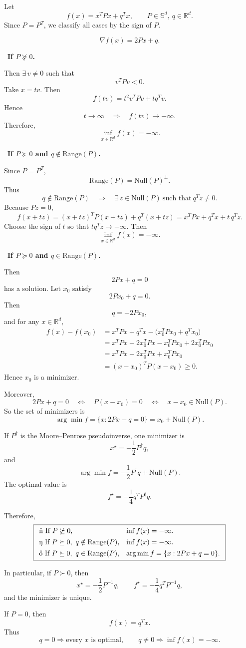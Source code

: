 \documentclass[11pt,letter,notitlepage]{article}
\theoremstyle{definition}
\begin{document}
\begin{solution}
Let
\[
f(x)=x^TPx+q^Tx,\qquad P\in\mathbb S^d,\ q\in\mathbb R^d.
\]
Since \(P=P^T\), we classify all cases by the sign of \(P\).

\[
\nabla f(x)=2Px+q.
\]

\ \textbf{If \(P\not\succeq 0\).}

Then \(\exists\,v\neq 0\) such that
\[
v^TPv<0.
\]
Take \(x=t v\). Then
\[
f(tv)=t^2v^TPv+tq^Tv.
\]
Hence
\[
t\to\infty
\quad\Longrightarrow\quad
f(tv)\to -\infty.
\]
Therefore,
\[
\inf_{x\in\mathbb R^d} f(x)=-\infty.
\]

\ \textbf{If \(P\succeq 0\) and \(q\notin\mathrm{Range}(P)\).}

Since \(P=P^T\),
\[
\mathrm{Range}(P)=\mathrm{Null}(P)^\perp.
\]
Thus
\[
q\notin\mathrm{Range}(P)
\quad\Longrightarrow\quad
\exists\,z\in\mathrm{Null}(P)\ \text{such that}\ q^Tz\neq 0.
\]
Because \(Pz=0\),
\[
f(x+t z)
=(x+t z)^TP(x+t z)+q^T(x+t z)
= x^TPx+q^Tx+t\,q^Tz.
\]
Choose the sign of \(t\) so that \(tq^Tz\to -\infty\). Then
\[
\inf_{x\in\mathbb R^d} f(x)=-\infty.
\]

\ \textbf{If \(P\succeq 0\) and \(q\in\mathrm{Range}(P)\).}

Then
\[
2Px+q=0
\]
has a solution. Let \(x_0\) satisfy
\[
2Px_0+q=0.
\]
Then
\[
q=-2Px_0,
\]
and for any \(x\in\mathbb R^d\),
\[
\begin{aligned}
f(x)-f(x_0)
&=x^TPx+q^Tx-\bigl(x_0^TPx_0+q^Tx_0\bigr)\\
&=x^TPx-2x_0^TPx-x_0^TPx_0+2x_0^TPx_0\\
&=x^TPx-2x_0^TPx+x_0^TPx_0\\
&=(x-x_0)^TP(x-x_0)\ge 0.
\end{aligned}
\]
Hence \(x_0\) is a minimizer.

Moreover,
\[
2Px+q=0
\quad\Longleftrightarrow\quad
P(x-x_0)=0
\quad\Longleftrightarrow\quad
x-x_0\in\mathrm{Null}(P).
\]
So the set of minimizers is
\[
\arg\min f
=
\{x:2Px+q=0\}
=
x_0+\mathrm{Null}(P).
\]

If \(P^\dagger\) is the Moore--Penrose pseudoinverse, one minimizer is
\[
x^\star=-\frac12 P^\dagger q,
\]
and
\[
\arg\min f
=
-\frac12 P^\dagger q+\mathrm{Null}(P).
\]
The optimal value is
\[
f^\star=-\frac14 q^TP^\dagger q.
\]

Therefore,
\[
\boxed{
\begin{array}{ll}
\ding{172}\ \text{If }P\not\succeq 0, & \inf f(x)=-\infty.\\[0.4em]
\ding{173}\ \text{If }P\succeq 0,\ q\notin\mathrm{Range}(P), & \inf f(x)=-\infty.\\[0.4em]
\ding{174}\ \text{If }P\succeq 0,\ q\in\mathrm{Range}(P), &
\arg\min f=\{x:2Px+q=0\}.
\end{array}}
\]

In particular, if \(P\succ 0\), then
\[
x^\star=-\frac12 P^{-1}q,
\qquad
f^\star=-\frac14 q^TP^{-1}q,
\]
and the minimizer is unique.

If \(P=0\), then
\[
f(x)=q^Tx.
\]
Thus
\[
q=0 \Longrightarrow \text{every }x\text{ is optimal},
\qquad
q\neq 0 \Longrightarrow \inf f(x)=-\infty.
\]
\end{solution}
\end{document}
